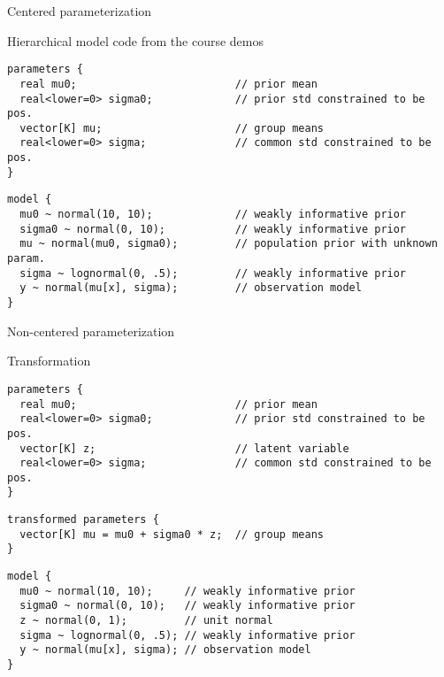 \documentclass[finnish,english,t]{beamer}
\begin{document}
\begin{frame}[fragile]{Centered parameterization}

\vspace{-0.5\baselineskip}
Hierarchical model code from the course demos

\vspace{-\baselineskip}
{\footnotesize
\begin{verbatim}
parameters {
  real mu0;                         // prior mean
  real<lower=0> sigma0;             // prior std constrained to be pos.
  vector[K] mu;                     // group means
  real<lower=0> sigma;              // common std constrained to be pos.
}
\end{verbatim}
}
\vspace{-\baselineskip}
{\footnotesize
\begin{verbatim}
model {
  mu0 ~ normal(10, 10);             // weakly informative prior
  sigma0 ~ normal(0, 10);           // weakly informative prior
  mu ~ normal(mu0, sigma0);         // population prior with unknown param.
  sigma ~ lognormal(0, .5);         // weakly informative prior
  y ~ normal(mu[x], sigma);         // observation model
}
\end{verbatim}
}
\end{frame}

\begin{frame}[fragile]{Non-centered parameterization}

\vspace{-0.5\baselineskip}
Transformation

{\footnotesize
\begin{verbatim}
parameters {
  real mu0;                         // prior mean
  real<lower=0> sigma0;             // prior std constrained to be pos.
  vector[K] z;                      // latent variable
  real<lower=0> sigma;              // common std constrained to be pos.
}
\end{verbatim}
}
\vspace{-\baselineskip}
{\footnotesize
\begin{verbatim}
transformed parameters {
  vector[K] mu = mu0 + sigma0 * z;  // group means
}
\end{verbatim}
}
\vspace{-\baselineskip}
{\footnotesize
\begin{verbatim}
model {
  mu0 ~ normal(10, 10);     // weakly informative prior
  sigma0 ~ normal(0, 10);   // weakly informative prior
  z ~ normal(0, 1);         // unit normal
  sigma ~ lognormal(0, .5); // weakly informative prior
  y ~ normal(mu[x], sigma); // observation model
}
\end{verbatim}
}

\end{frame}
\end{document}
